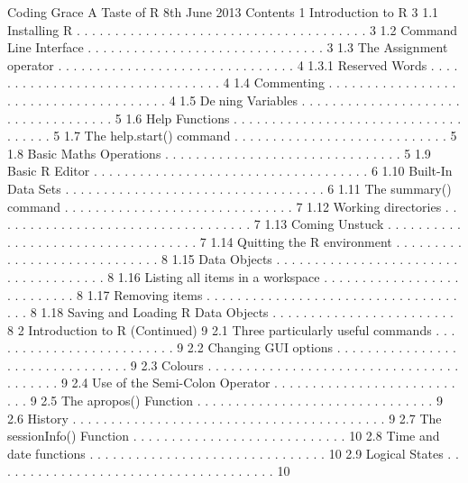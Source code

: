 Coding Grace A Taste of R 8th June 2013
Contents
1 Introduction to R 3
1.1 Installing R . . . . . . . . . . . . . . . . . . . . . . . . . . . . . . . . . . . . . . 3
1.2 Command Line Interface . . . . . . . . . . . . . . . . . . . . . . . . . . . . . . . 3
1.3 The Assignment operator . . . . . . . . . . . . . . . . . . . . . . . . . . . . . . . 4
1.3.1 Reserved Words . . . . . . . . . . . . . . . . . . . . . . . . . . . . . . . . 4
1.4 Commenting . . . . . . . . . . . . . . . . . . . . . . . . . . . . . . . . . . . . . . 4
1.5 Dening Variables . . . . . . . . . . . . . . . . . . . . . . . . . . . . . . . . . . . 5
1.6 Help Functions . . . . . . . . . . . . . . . . . . . . . . . . . . . . . . . . . . . . 5
1.7 The help.start() command . . . . . . . . . . . . . . . . . . . . . . . . . . . . 5
1.8 Basic Maths Operations . . . . . . . . . . . . . . . . . . . . . . . . . . . . . . . 5
1.9 Basic R Editor . . . . . . . . . . . . . . . . . . . . . . . . . . . . . . . . . . . . 6
1.10 Built-In Data Sets . . . . . . . . . . . . . . . . . . . . . . . . . . . . . . . . . . 6
1.11 The summary() command . . . . . . . . . . . . . . . . . . . . . . . . . . . . . . 7
1.12 Working directories . . . . . . . . . . . . . . . . . . . . . . . . . . . . . . . . . . 7
1.13 Coming Unstuck . . . . . . . . . . . . . . . . . . . . . . . . . . . . . . . . . . . 7
1.14 Quitting the R environment . . . . . . . . . . . . . . . . . . . . . . . . . . . . . 8
1.15 Data Objects . . . . . . . . . . . . . . . . . . . . . . . . . . . . . . . . . . . . . 8
1.16 Listing all items in a workspace . . . . . . . . . . . . . . . . . . . . . . . . . . . 8
1.17 Removing items . . . . . . . . . . . . . . . . . . . . . . . . . . . . . . . . . . . . 8
1.18 Saving and Loading R Data Objects . . . . . . . . . . . . . . . . . . . . . . . . 8
2 Introduction to R (Continued) 9
2.1 Three particularly useful commands . . . . . . . . . . . . . . . . . . . . . . . . . 9
2.2 Changing GUI options . . . . . . . . . . . . . . . . . . . . . . . . . . . . . . . . 9
2.3 Colours . . . . . . . . . . . . . . . . . . . . . . . . . . . . . . . . . . . . . . . . 9
2.4 Use of the Semi-Colon Operator . . . . . . . . . . . . . . . . . . . . . . . . . . . 9
2.5 The apropos() Function . . . . . . . . . . . . . . . . . . . . . . . . . . . . . . . 9
2.6 History . . . . . . . . . . . . . . . . . . . . . . . . . . . . . . . . . . . . . . . . . 9
2.7 The sessionInfo() Function . . . . . . . . . . . . . . . . . . . . . . . . . . . . 10
2.8 Time and date functions . . . . . . . . . . . . . . . . . . . . . . . . . . . . . . . 10
2.9 Logical States . . . . . . . . . . . . . . . . . . . . . . . . . . . . . . . . . . . . . 10
